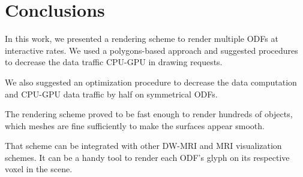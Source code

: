 \documentclass[twoside,twocolumn,10pt]{article}
\begin{document}

\section{Conclusions}
\label{sec::conclusions}

In this work, we presented a rendering scheme to render multiple ODFs at interactive rates. We used a polygons-based approach and suggested procedures to decrease the data traffic CPU-GPU in drawing requests.

We also suggested an optimization procedure to decrease the data computation and CPU-GPU data traffic by half on symmetrical ODFs.

The rendering scheme proved to be fast enough to render hundreds of objects, which meshes are fine sufficiently to make the surfaces appear smooth.

That scheme can be integrated with other DW-MRI and MRI visualization schemes. It can be a handy tool to render each ODF's glyph on its respective voxel in the scene.









\end{document}
